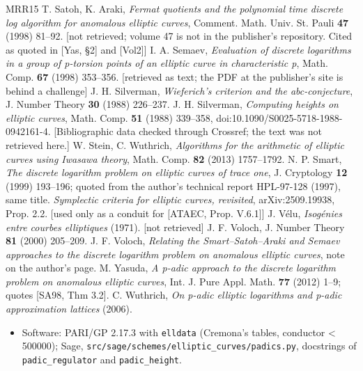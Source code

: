\documentclass[11pt,a4paper]{article}
\theoremstyle{named}
\begin{document}
\begin{thebibliography}{MRR15}
 T. Satoh, K. Araki, \textit{Fermat quotients and the polynomial time discrete log algorithm for anomalous elliptic curves}, Comment. Math. Univ. St. Pauli \textbf{47} (1998) 81–92. [not retrieved; volume 47 is not in the publisher's repository. Cited as quoted in [Yas, §2] and [Vol2]]
 I. A. Semaev, \textit{Evaluation of discrete logarithms in a group of p-torsion points of an elliptic curve in characteristic p}, Math. Comp. \textbf{67} (1998) 353–356. [retrieved as text; the PDF at the publisher's site is behind a challenge]
 J. H. Silverman, \textit{Wieferich's criterion and the abc-conjecture}, J. Number Theory \textbf{30} (1988) 226–237.
 J. H. Silverman, \textit{Computing heights on elliptic curves}, Math. Comp. \textbf{51} (1988) 339–358, doi:10.1090/S0025-5718-1988-0942161-4. [Bibliographic data checked through Crossref; the text was not retrieved here.]
 W. Stein, C. Wuthrich, \textit{Algorithms for the arithmetic of elliptic curves using Iwasawa theory}, Math. Comp. \textbf{82} (2013) 1757–1792.
 N. P. Smart, \textit{The discrete logarithm problem on elliptic curves of trace one}, J. Cryptology \textbf{12} (1999) 193–196; quoted from the author's technical report HPL-97-128 (1997), same title.
 \textit{Symplectic criteria for elliptic curves, revisited}, arXiv:2509.19938, Prop. 2.2. [used only as a conduit for [ATAEC, Prop. V.6.1]]
 J. Vélu, \textit{Isogénies entre courbes elliptiques} (1971). [not retrieved]
 J. F. Voloch, J. Number Theory \textbf{81} (2000) 205–209.
 J. F. Voloch, \textit{Relating the Smart–Satoh–Araki and Semaev approaches to the discrete logarithm problem on anomalous elliptic curves}, note on the author's page.
 M. Yasuda, \textit{A p-adic approach to the discrete logarithm problem on anomalous elliptic curves}, Int. J. Pure Appl. Math. \textbf{77} (2012) 1–9; quotes [SA98, Thm 3.2].
 C. Wuthrich, \textit{On p-adic elliptic logarithms and p-adic approximation lattices} (2006).
\begin{itemize}[leftmargin=1.4em,itemsep=.2em,topsep=.3em]
\item Software: PARI/GP 2.17.3 with \texttt{elldata} (Cremona's tables, conductor \textless{} 500000); Sage, \texttt{src/sage/schemes/elliptic\_\allowbreak{}curves/padics.\allowbreak{}py}, docstrings of \texttt{padic\_\allowbreak{}regulator} and \texttt{padic\_\allowbreak{}height}.
\end{itemize}

\end{thebibliography}
\end{document}

